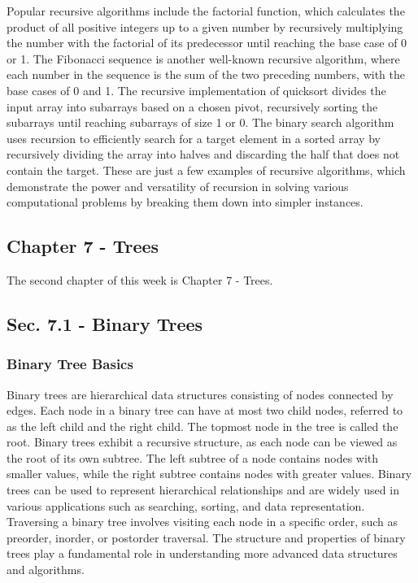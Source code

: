 Popular recursive algorithms include the factorial function, which calculates the product of all positive integers up to a given number by recursively multiplying the number with the factorial of its predecessor until reaching the base case of 0 or 1. The Fibonacci sequence is another well-known recursive algorithm, where each number in the sequence is the sum of 
the two preceding numbers, with the base cases of 0 and 1. The recursive implementation of quicksort divides the input array into subarrays based on a chosen pivot, recursively sorting the subarrays until reaching subarrays of size 1 or 0. The binary search algorithm uses recursion to efficiently search for a target element in a sorted array by recursively dividing 
the array into halves and discarding the half that does not contain the target. These are just a few examples of recursive algorithms, which demonstrate the power and versatility of recursion in solving various computational problems by breaking them down into simpler instances.

\subsection{Chapter 7 - Trees}

The second chapter of this week is Chapter 7 - Trees.

\subsection*{Sec. 7.1 - Binary Trees}

\subsubsection{Binary Tree Basics}

Binary trees are hierarchical data structures consisting of nodes connected by edges. Each node in a binary tree can have at most two child nodes, referred to as the left child and the right child. The topmost node in the tree is called the root. Binary trees exhibit a recursive structure, as each node can be viewed as the root of its own subtree. 
The left subtree of a node contains nodes with smaller values, while the right subtree contains nodes with greater values. Binary trees can be used to represent hierarchical relationships and are widely used in various applications such as searching, sorting, and data representation. Traversing a binary tree involves visiting each node in a specific order, 
such as preorder, inorder, or postorder traversal. The structure and properties of binary trees play a fundamental role in understanding more advanced data structures and algorithms.

